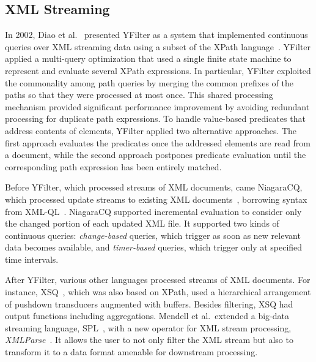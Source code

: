 \subsection{XML Streaming}\label{sec:xml} %

In 2002, Diao et al.~\cite{diao_et_al_2002,diao2003high} presented
\textsf{YFilter} as a system that implemented continuous queries over XML
streaming data using a subset of the XPath
language~\cite{clark_derose_1999}. YFilter applied a multi-query
optimization that used a single finite state machine to represent and
evaluate several XPath expressions. In particular, YFilter exploited
the commonality among path queries by merging the common prefixes of
the paths so that they were processed at most once. This shared
processing mechanism provided significant performance improvement by
avoiding redundant processing for duplicate path expressions.  To
handle value-based predicates that address contents of elements,
YFilter applied two alternative approaches. The first approach
evaluates the predicates once the addressed elements are read from a
document, while the second approach postpones predicate evaluation
until the corresponding path expression has been entirely matched.

Before YFilter, which processed streams of XML documents, came
\textsf{NiagaraCQ}, which processed update streams to existing XML
documents~\cite{chen_et_al_2000}, borrowing syntax from
XML-QL~\cite{deutsch1999query}.  NiagaraCQ supported incremental
evaluation to consider only the changed portion of each updated XML
file. It supported two kinds of continuous queries:
\emph{change-based} queries, which trigger as soon as new relevant
data becomes available, and \emph{timer-based} queries, which trigger
only at specified time intervals.

After YFilter, various other languages processed streams of XML
documents.  For instance, \textsf{XSQ}~\cite{peng_chawathe_2003}, which was
also based on XPath, used a hierarchical arrangement of pushdown
transducers augmented with buffers. Besides filtering, XSQ had output
functions including aggregations.  Mendell et al.\ extended a big-data
streaming language, SPL~\cite{hirzel_schneider_gedik_2017}, with a new
operator for XML stream processing,
\emph{XMLParse}~\cite{mendell_et_al_2012}. It allows the user to not
only filter the XML stream but also to transform it to a data format
amenable for downstream processing.
